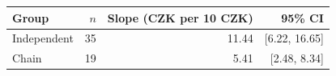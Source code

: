 \begin{tabular}{lrrr}
\toprule
Group & $n$ & Slope (CZK per 10 CZK) & 95\% CI \\
\midrule
Independent & 35 & 11.44 & [6.22, 16.65] \\
Chain & 19 & 5.41 & [2.48, 8.34] \\
\bottomrule
\end{tabular}
